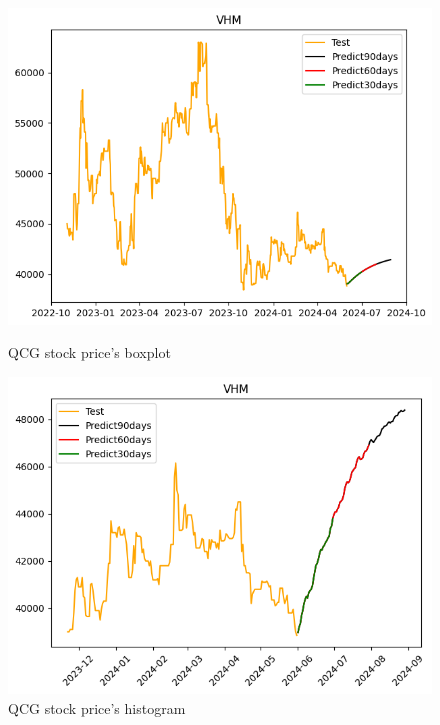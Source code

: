 \documentclass{ieeeojies}
\begin{document}
  \begin{figure}[H]
    \centering
    \begin{minipage}{0.23\textwidth}
    \centering
    \includegraphics[width=1\textwidth]{bibliography/Figure/VHMGRU_7-3.png}
    \caption{QCG stock price's boxplot}
    \label{fig:1}
    \end{minipage}
    \hfill
    \begin{minipage}{0.23\textwidth}
    \centering
    \includegraphics[width=1\textwidth]{bibliography/Figure/VHMRNN_9-1.png}
    \caption{QCG stock price's histogram}
    \label{fig:2}
    \end{minipage}
  \end{figure}
\end{document}
